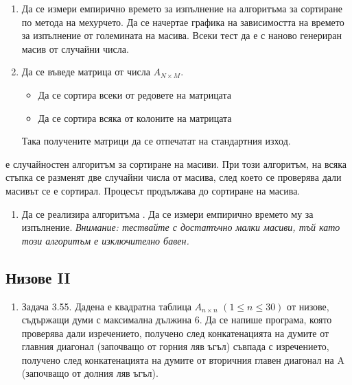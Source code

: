 {\begin{enumerate}[resume]

  \item Да се измери емпирично времето за изпълнение на алгоритъма за сортиране по метода на мехурчето. Да се начертае графика на зависимостта на времето за изпълнение от големината на масива. Всеки тест да е с наново генериран масив от случайни числа.
  \item Да се въведе матрица от числа $A_{N \times M}$.
  \begin{itemize}
      \item Да се сортира всеки от редовете на матрицата
      \item Да се сортира всяка от колоните на матрицата
  \end{itemize}
  Така получените матрици да се отпечатат на стандартния изход.

\end{enumerate}



\begin{mdframed}[hidealllines=true,backgroundcolor=gray!20]
 е случайностен алгоритъм за сортиране на масиви. При този алгоритъм, на всяка стъпка се разменят две случайни числа от масива, след което се проверява дали масивът се е сортирал. Процесът продължава до сортиране на масива.
\end{mdframed}

\begin{enumerate}[resume]

  \item Да се реализира алгоритъма . Да се измери емпирично времето му за изпълнение. \emph{Внимание: тествайте с достатъчно малки масиви, тъй като този алгоритъм е изключително бавен.}

\end{enumerate}

\subsection {Низове II}

\begin{enumerate}[resume]

  \item Задача 3.55. \cite{sbornik} Дадена е квадратна таблица $A_{n\times n}$ $(1 \le n \le 30)$ от низове, съдържащи думи с максимална дължина 6. Да се напише програма, която проверява дали изречението, получено след конкатенацията на думите от главния диагонал (започващо от горния ляв ъгъл) съвпада с изречението, получено след конкатенацията на думите от вторичния главен диагонал на A (започващо от долния ляв ъгъл).


\end{enumerate}}
